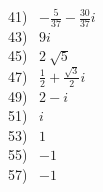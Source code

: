 \documentclass[11pt]{book}
\theoremstyle{definition}  %
\begin{document}
\begin{multicols}{2}
  41)~ $-\frac{5}{37}-\frac{30}{37}i$\\
  43)~ $9i$\\
  45)~ $2~\sqrt{5}$\\
  47)~ $\frac{1}{2}+\frac{\sqrt{3}}{2}i$\\
  49)~ $2-i$\\
  51)~ $i$\\
  53)~ $1$\\
  55)~ $-1$\\
  57)~ $-1$%

\end{multicols}
\end{document}
